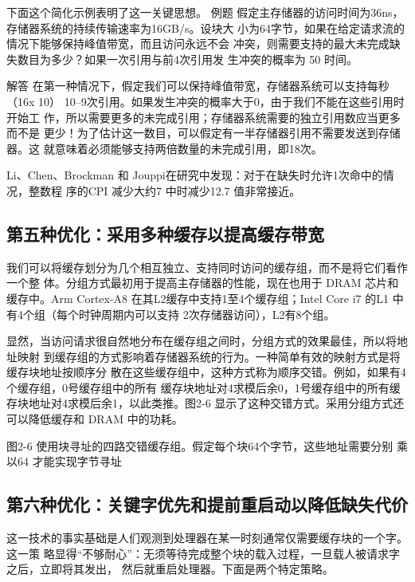 下面这个简化示例表明了这一关键思想。
例题
假定主存储器的访问时间为36ns，存储器系统的持续传输速率为16GB/s。设块大
小为64字节，如果在给定请求流的情况下能够保持峰值带宽，而且访问永远不会
冲突，则需要支持的最大未完成缺失数目为多少？如果一次引用与前4次引用发
生冲突的概率为 50%
时间。

解答
在第一种情况下，假定我们可以保持峰值带宽，存储器系统可以支持每秒（16x
10）%
10--9次引用。如果发生冲突的概率大于0，由于我们不能在这些引用时开始工
作，所以需要更多的未完成引用；存储器系统需要的独立引用数应当更多而不是
更少！为了估计这一数目，可以假定有一半存储器引用不需要发送到存储器。这
就意味着必须能够支持两倍数量的未完成引用，即18次。

Li、Chen、Brockman 和 Jouppi在研究中发现：对于在缺失时允许1次命中的情况，整数程
序的CPI 减少大约7%
中时减少12.7%
值非常接近。

\subsection{第五种优化：采用多种缓存以提高缓存带宽}
我们可以将缓存划分为几个相互独立、支持同时访问的缓存组，而不是将它们看作一个整
体。分组方式最初用于提高主存储器的性能，现在也用于 DRAM 芯片和缓存中。Arm Cortex-A8
在其L2缓存中支持1至4个缓存组；Intel Core i7 的L1 中有4个组（每个时钟周期内可以支持
2次存储器访问），L2有8个组。

显然，当访问请求很自然地分布在缓存组之间时，分组方式的效果最佳，所以将地址映射
到缓存组的方式影响着存储器系统的行为。一种简单有效的映射方式是将缓存块地址按顺序分
散在这些缓存组中，这种方式称为顺序交错。例如，如果有4个缓存组，0号缓存组中的所有
缓存块地址对4求模后余0，1号缓存组中的所有缓存块地址对4求模后余1，以此类推。图2-6
显示了这种交错方式。采用分组方式还可以降低缓存和 DRAM 中的功耗。


图2-6 使用块寻址的四路交错缓存组。假定每个块64个字节，这些地址需要分别
乘以64 才能实现字节寻址

\subsection{第六种优化：关键字优先和提前重启动以降低缺失代价}
这一技术的事实基础是人们观测到处理器在某一时刻通常仅需要缓存块的一个字。这一策
略显得“不够耐心”：无须等待完成整个块的载入过程，一旦载人被请求字之后，立即将其发出，
然后就重启处理器。下面是两个特定策略。

